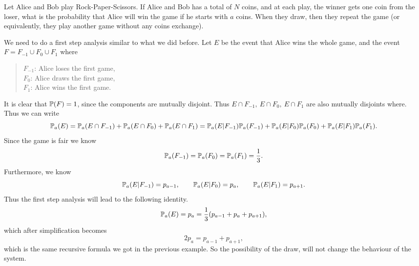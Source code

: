 \begin{example}
	Let Alice and Bob play Rock-Paper-Scissors. If Alice and Bob has a total of $N$ coins, and at each play, the winner gets one coin from the loser, what is the probability that Alice will win the game if he starts with $a$ coins. When they draw, then they repeat the game (or equivalently, they play another game without any coins exchange).
	
	\begin{solution}
		We need to do a first step analysis similar to what we did before. Let $E$ be the event that Alice wins the whole game, and the event $F=F_{-1}\cup F_0 \cup F_1$ where
		\begin{quote}
			$F_{-1}$: Alice loses the first game,\\
			$F_0$: Alice draws the first game,\\
			$F_1$: Alice wins the first game.
		\end{quote}
		It is clear that $\mathbb{P}(F) = 1$, since the components are mutually disjoint. Thus $E\cap F_{-1},\ E\cap F_0,\ E\cap F_1$ are also mutually disjoints where. Thus we can write
		\[\mathbb{P}_a(E) = \mathbb{P}_a(E\cap F_{-1}) + \mathbb{P}_a(E\cap F_0) + \mathbb{P}_a(E\cap F_1)
				= \mathbb{P}_a(E|F_{-1})\mathbb{P}_a(F_{-1}) + \mathbb{P}_a(E|F_0)\mathbb{P}_a(F_0) + \mathbb{P}_a(E|F_1)\mathbb{P}_a(F_1).
		\]
		Since the game is fair we know
		\[ \mathbb{P}_a(F_{-1}) = \mathbb{P}_a(F_0) = \mathbb{P}_a(F_1) = \frac{1}{3}.  \]
		Furthermore, we know
		\[ \mathbb{P}_a(E|F_{-1}) = p_{a-1}, \qquad \mathbb{P}_a(E|F_0) = p_a, \qquad \mathbb{P}_a(E|F_1) = p_{a+1}. \]
		Thus the first step analysis will lead to the following identity.
		\[  \mathbb{P}_a(E) = p_a = \frac{1}{3} ( p_{a-1} + p_{a} + p_{a+1}),\]
		which after simplification becomes
		\[ 2p_a = p_{a-1} + p_{a+1}, \]
		which is the same recursive formula we got in the previous example. So the possibility of the draw, will not change the behaviour of the system.
	\end{solution}
\end{example}

